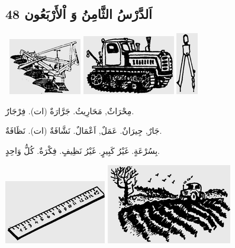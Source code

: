 \documentclass[a5paper]{article}
\begin{document}
\subsection{اَلدَّرْسُ الثَّامِنُ وَ اْلأَرْبَعُون 48}
\  \includegraphics[width=1.25in,height=0.9689in]{MuhammadBagauddinlatinized-img156.png}   \includegraphics[width=1.5937in,height=1.0209in]{MuhammadBagauddinlatinized-img157.png}   \includegraphics[width=0.3752in,height=1.0728in]{MuhammadBagauddinlatinized-img158.png} 

مِحْرَاثٌ, مَحَارِيثُ. جَرَّارَةٌ (ات). فِرْجَارٌ. 

جَارٌ, جِيرَانٌ. عَمَلٌ, اَعْمَالٌ. نَشَّافَةٌ (ات). نَظَافَةٌ.

بِسُرْعَةٍ. غَيْرُ كَبِيرٍ. غَيْرُ نَظِيفٍ. فِكْرَةٌ. كُلُّ وَاحِدٍ.

 \includegraphics[width=1.75in,height=1.0937in]{MuhammadBagauddinlatinized-img159.png}   \includegraphics[width=2.1563in,height=1.3752in]{MuhammadBagauddinlatinized-img160.png} 
\end{document}
